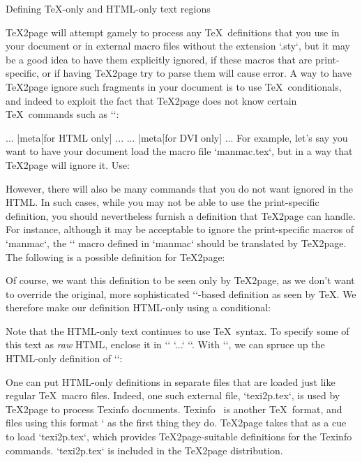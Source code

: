\beginsection Defining \TeX-only and HTML-only text regions

\TeX2page will attempt gamely to process any \TeX\
definitions that you use in your document or in
external macro files without the extension `.sty`,
but it may be a good idea to have them explicitly
ignored, if these
macros that are print-specific, or if
having \TeX2page try to parse them will cause error.  A way
to have \TeX2page ignore such fragments in your document
is  to use
\TeX\ conditionals, and indeed to exploit the
fact that \TeX2page does not know certain \TeX\ commands
such as `\shipout`:

\begintt
\ifx\shipout\UnDeFiNeD
  ... |meta[for HTML only] ...
\else
  ... |meta[for DVI only] ...
\fi
\endtt
For example, let’s say you want to have  your document load the macro file
`manmac.tex`, but in a way that \TeX2page will ignore
it.  Use:

\begintt
\ifx\shipout\UnDeFiNeD
\else
  
\fi
\endtt
However, there will also be many  commands that
you do not want ignored in the HTML.  In such
cases, while you may not be able to use the print-specific
definition, you should nevertheless furnish a definition that \TeX2page
can handle.  For instance, although it may be acceptable
to ignore the print-specific macros of `manmac`, the
`\bull` macro defined in `manmac` should be
translated by \TeX2page.  The following is a possible
definition for \TeX2page:

\begintt
\def\bull{{\bf *}}
\endtt
Of course, we want this definition to be seen only
by \TeX2page, as we don’t want to override the
original, more sophisticated `\vrule`-based definition as seen
by \TeX.
We therefore make our
definition HTML-only
using a conditional:

\begintt
\ifx\shipout\UnDeFiNeD %
  \def\bull{{\bf *}}
\fi
\endtt

Note that the HTML-only text continues to use \TeX\ syntax.
To specify some of this text as {\em raw} HTML, enclose it
in `\rawhtml` `...` `\endrawhtml`.   With
`\rawhtml`, we can
spruce up the
HTML-only definition of `\bull`:

\begintt
\ifx\shipout\UnDeFiNeD %
  \def\bull{{\bf
  \rawhtml<span style="color: #990000">&spades;</span>\endrawhtml
  }}
\fi
\endtt

One can put HTML-only definitions in separate files
that are loaded just like regular \TeX\ macro files.
Indeed, one such external file, `texi2p.tex`, is used
by \TeX2page to process Texinfo
documents.  Texinfo~\cite{texinfo} is another \TeX\
format, and files using this format `
as the first thing they do.  \TeX2page takes that as a
cue to
load `texi2p.tex`, which provides \TeX2page-suitable
definitions for the Texinfo commands.  `texi2p.tex`
is included in the \TeX2page distribution.

